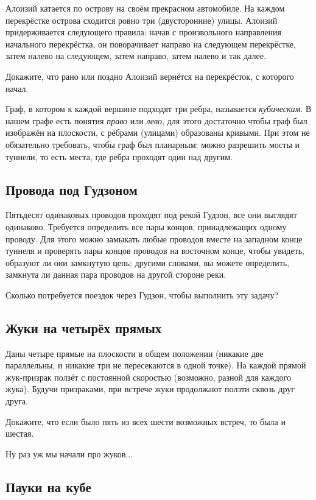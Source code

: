 Алоизий катается по острову на своём прекрасном автомобиле.
На каждом перекрёстке острова сходится ровно три (двусторонние) улицы.
Алоизий придерживается следующего правила:
начав с произвольного направления начального перекрёстка, он поворачивает направо на следующем перекрёстке, затем налево на следующем, затем направо, затем налево и так далее.

Докажите, что рано или поздно Алоизий вернётся на перекрёсток, с которого начал.

 Граф, в котором к каждой вершине подходят три ребра, называется \emph{кубическим}.
В нашем графе есть понятия \emph{право} или \emph{лево},
для этого достаточно чтобы граф был изображён на плоскости, с рёбрами (улицами) образованы кривыми.
При этом не обязательно требовать, чтобы граф был планарным;
можно разрешить мосты и туннели, то есть места, где ребра проходят один над другим.

\subsection*{Провода под Гудзоном}

Пятьдесят одинаковых проводов проходят под рекой Гудзон, все они выглядят одинаково.
Требуется определить все пары концов, принадлежащих одному проводу.
Для этого можно замыкать любые проводов вместе на западном конце туннеля и проверять пары концов проводов на восточном конце, чтобы увидеть, образуют ли они замкнутую цепь;
другими словами, вы можете определить, замкнута ли данная пара проводов на другой стороне реки.

Сколько потребуется поездок через Гудзон, чтобы выполнить эту задачу?

\subsection*{Жуки на четырёх прямых}

Даны четыре прямые на плоскости в общем положении (никакие две параллельны, и никакие три не пересекаются в одной точке).
На каждой прямой жук-призрак ползёт с постоянной скоростью (возможно, разной для каждого жука).
Будучи призраками, при встрече жуки продолжают ползти сквозь друг друга.

Докажите, что если было пять из всех шести возможных встреч,
то была и шестая.

\medskip

Ну раз уж мы начали про жуков...

\subsection*{Пауки на кубе}

